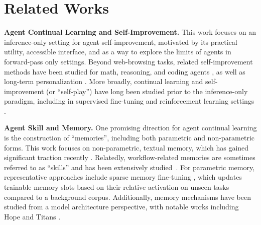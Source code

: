 \documentclass{article}
\begin{document}
\section{Related Works}

\textbf{Agent Continual Learning and Self-Improvement.} 
This work focuses on an inference-only setting for agent self-improvement, motivated by its practical utility, accessible interface, and as a way to explore the limits of agents in forward-pass only settings. Beyond web-browsing tasks, related self-improvement methods have been studied for math, reasoning, and coding agents \citep{hu2025automated,zhang2026darwin,wang2026huxleygodel}, as well as long-term personalization \citep{maharana-etal-2024-evaluating,shaikh2026learningactionpredictorshumancomputer}.
More broadly, continual learning and self-improvement (or ``self-play'') have long been studied prior to the inference-only paradigm, including in supervised fine-tuning \citep{zelikman2022star, chen2024selfplay} and reinforcement learning settings \citep{alphago}.

\textbf{Agent Skill and Memory.}
One promising direction for agent continual learning is the construction of ``memories'', including both parametric and non-parametric forms. This work focuses on non-parametric, textual memory, which has gained significant traction recently \cite{AMEM, personamem, Memorybank, MemGPT, mem0}. Relatedly, workflow-related memories are sometimes referred to as ``skills'' and has been extensively studied~\cite{zhang2025skills,li2026skillsbenchbenchmarkingagentskills,tian2026skillscoachselfevolvingskilloptimizer,jiang2026xskillcontinuallearningexperience}.
For parametric memory, representative approaches include sparse memory fine-tuning \cite{sparsefinetuning}, which updates trainable memory slots based on their relative activation on unseen tasks compared to a background corpus. Additionally, memory mechanisms have been studied from a model architecture perspective, with notable works including Hope \cite{NestedLearning} and Titans \cite{TITANS}.
\end{document}
